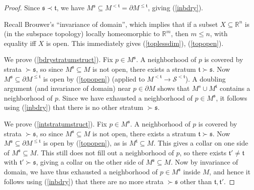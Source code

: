\documentclass[12pt]{article}
\theoremstyle{definition}
\theoremstyle{remark}
\numberwithin{equation}{subsection}
\newcommand{\s}{\mathfrak s}
\newcommand{\ttt}{\mathfrak t}
\newcommand{\RR}{\mathbb R}
\newcommand{\SSS}{\mathcal S}
\begin{document}
\begin{proof}
Since $\s\prec\ttt$, we have $M^\s\subseteq M^{<\ttt}=\partial M^{\leq\ttt}$, giving (\ref{inbdry}).

Recall Brouwer's ``invariance of domain'', which implies that if a subset $X\subseteq\RR^n$ is (in the subspace topology) locally homeomorphic to $\RR^m$, then $m\leq n$, with equality iff $X$ is open.  This immediately gives (\ref{toplessdim}), (\ref{topopen}).

We prove (\ref{bdrystratumstruct}).  Fix $p\in M^\s$.  A neighborhood of $p$ is covered by strata $\succ\s$, so since $M^\s\subseteq M$ is not open, there exists a stratum $\ttt\succ\s$.  Now $M^\s\subseteq\partial M^{\leq\ttt}$ is open by (\ref{topopen}) (applied to $M^{<\ttt}\to\SSS^{<\ttt}$).  A doubling argument (and invariance of domain) near $p\in\partial M$ shows that $M^s\cup M^\ttt$ contains a neighborhood of $p$.  Since we have exhausted a neighborhood of $p\in M^\s$, it follows using (\ref{inbdry}) that there is no other stratum $\succ\s$.

We prove (\ref{intstratumstruct}).  Fix $p\in M^\s$.  A neighborhood of $p$ is covered by strata $\succ\s$, so since $M^\s\subseteq M$ is not open, there exists a stratum $\ttt\succ\s$.  Now $M^\s\subseteq\partial M^{\leq\ttt}$ is open by (\ref{topopen}), as is $M^\ttt\subseteq M$.  This gives a collar on one side of $M^\s\subseteq M$.  This still does not fill out a neighborhood of $p$, so there exists $\ttt'\ne\ttt$ with $\ttt'\succ\s$, giving a collar on the other side of $M^\s\subseteq M$.  Now by invariance of domain, we have thus exhausted a neighborhood of $p\in M^\s$ inside $M$, and hence it follows using (\ref{inbdry}) that there are no more strata $\succ\s$ other than $\ttt,\ttt'$.
\end{proof}
\end{document}
